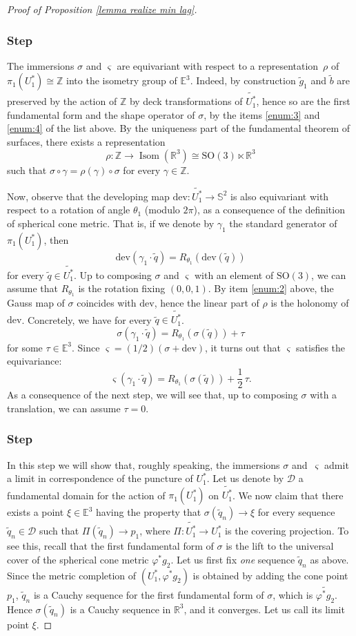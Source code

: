 \documentclass[11pt]{article}
\let\mathcal\mathscr
\newcounter{steps}
\newcommand{\step}{\refstepcounter{steps}\subsubsection*{Step \thesteps}}
\theoremstyle{definition}
\newcommand{\R}{{\mathbb R}}
\newcommand{\E}{\mathbb{E}}
\newcommand{\dev}{\mathrm{dev}}
\newcommand{\SO}{\mathrm{SO}}
\DeclareMathOperator{\Isom}{Isom}
\begin{document}
\begin{proof}[Proof of Proposition \ref{lemma realize min lag}]
\step\label{step:2}
The immersions $\sigma$ and $ \varsigma$ are equivariant with respect to a representation~$\rho$ of $\pi_1(U_1^*)\cong\mathbb Z$ into the isometry group of $\E^3$. Indeed, by construction $\widetilde g_1$ and $\widetilde b$ are preserved by the action of $\mathbb Z$ by deck transformations of $\widetilde{U_1^*}$, hence so are the first fundamental form and the shape operator of $ \sigma$, by the items \eqref{enum:3} and \eqref{enum:4} of the list above. By the uniqueness part of the fundamental theorem of surfaces, there exists a representation
\[
\rho:\mathbb Z\to\Isom(\R^3)\cong\SO(3)\ltimes\R^3
\] such that $\sigma\circ \gamma=\rho(\gamma)\circ\sigma$ for every $\gamma\in\mathbb Z$.

Now, observe that the developing map $\dev:\widetilde{U_1^*}\to\mathbb S^2$ is also equivariant with respect to a rotation of angle $\theta_1$ (modulo $2\pi$), as a consequence of the definition of spherical cone metric. That is, if we denote by $\gamma_1$ the standard generator of $\pi_1(U_1^*)$, then
\[
\dev(\gamma_1\cdot \widetilde q)=R_{\theta_1}(\dev(\widetilde q))
\]
for every $\widetilde q\in \widetilde{U_1^*}$.
Up to composing $\sigma$ and $\varsigma$ with an element of $\SO(3)$, we can assume that $R_{\theta_1}$ is the rotation fixing $(0,0,1)$.
By item \eqref{enum:2} above, the Gauss map of $\sigma$ coincides with $\dev$, hence the linear part of $\rho$ is the holonomy of $\dev$. Concretely, we have for every $\widetilde q\in \widetilde{U_1^*}$.
\[
\sigma(\gamma_1\cdot \widetilde q)=R_{\theta_1}(\sigma(\widetilde q))+\tau
\]
for some $\tau\in \E^3$. Since $\varsigma=(1/2)(\sigma+\dev)$, it turns out that $\varsigma$ satisfies the equivariance:
\[
\varsigma(\gamma_1\cdot \widetilde q)=R_{\theta_1}(\sigma(\widetilde q))+\frac{1}{2}\,\tau.
\]
As a consequence of the next step, we will see that, up to composing $\sigma$ with a translation, we can assume $\tau=0$.

\step\label{step:3}
In this step we will show that, roughly speaking, the immersions $\sigma$ and~$\varsigma$ admit a limit in correspondence of the puncture of $U_1^*$. Let us denote by $\mathcal D$ a fundamental domain for the action of $\pi_1(U_1^*)$ on $\widetilde{U_1^*}$. We now claim that there exists a point $\xi\in\E^3$ having the property that $\sigma(\widetilde q_n)\to \xi$ for every sequence $\widetilde q_n\in\mathcal D$ such that $\Pi(\widetilde q_n)\to p_1$, where $\Pi:\widetilde{U_1^*}\to U_1^*$ is the covering projection.
To see this, recall that the first fundamental form of $\sigma$ is the lift to the universal cover of the spherical cone metric $\varphi^*g_2$. Let us first fix \emph{one} sequence $\widetilde q_n$ as above. Since the metric completion of $(U_1^*,\varphi^*g_2)$ is obtained by adding the cone point $p_1$, $\widetilde q_n$ is a Cauchy sequence for the first fundamental form of $\sigma$, which is $\widetilde{\varphi^*g_2}$. Hence $\sigma(\widetilde q_n)$ is a Cauchy sequence in $\R^3$, and it converges. Let us call its limit point $\xi$.


\end{proof}
\end{document}
